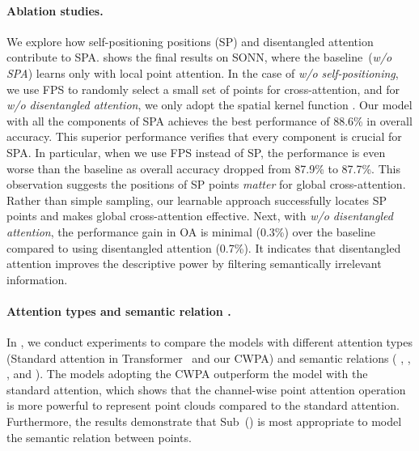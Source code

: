 \documentclass[10pt,twocolumn,letterpaper]{article}
\begin{document}
\paragraph{Ablation studies.}
We explore how self-positioning positions (SP) and disentangled attention contribute to SPA.
 shows the final results on SONN, where the baseline~(\textit{w/o SPA}) learns only with local point attention.
In the case of \textit{w/o self-positioning}, we use FPS to randomly select a small set of points for cross-attention, and for \textit{w/o disentangled attention}, we only adopt the spatial kernel function .
Our model with all the components of SPA achieves the best performance of 88.6\% in overall accuracy.
This superior performance verifies that every component is crucial for SPA.
In particular, when we use FPS instead of SP, the performance is even worse than the baseline as overall accuracy dropped from 87.9\% to 87.7\%.
This observation suggests the positions of SP points \textit{matter} for global cross-attention.
Rather than simple sampling, our learnable approach successfully locates SP points and makes global cross-attention effective.
Next, with \textit{w/o disentangled attention}, the performance gain in OA is minimal (0.3\%) over the baseline compared to using disentangled attention (0.7\%).
It indicates that disentangled attention improves the descriptive power by filtering semantically irrelevant information.

\paragraph{Attention types and semantic relation .}
In , we conduct experiments to compare the models with different attention types (Standard attention in Transformer~\cite{vaswani2017attention} and our CWPA) and semantic relations ( , , , and ).
The models adopting the CWPA outperform the model with the standard attention, which shows that the channel-wise point attention operation is more powerful to represent point clouds compared to the standard attention.
Furthermore, the results demonstrate that Sub~() is most appropriate to model the semantic relation between points. 
\end{document}
